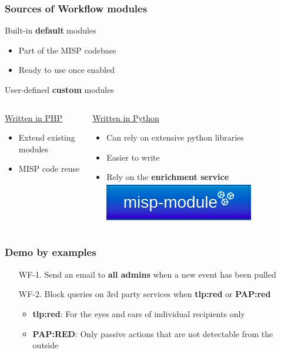 \begin{frame}
    \frametitle{Sources of Workflow modules}
    {\large Built-in \textbf{default} modules}
    \begin{itemize}
        \item Part of the MISP codebase
        \item Ready to use once enabled
    \end{itemize}
    \vspace{1em}
    {\large User-defined \textbf{custom} modules}
    \vspace{0.5em}
    \begin{columns}[t]
        \begin{column}{0.5\textwidth}
            \underline{Written in PHP}
            \begin{itemize}
                \item Extend existing modules
                \item MISP code reuse
            \end{itemize}
        \end{column}
        \begin{column}{0.5\textwidth}
            \underline{Written in Python}
            \begin{itemize}
                \item Can rely on extensive python libraries
                \item Easier to write
                \item Rely on the \textbf{enrichment service} \includegraphics[width=0.12\linewidth]{pictures/misp-module-icon.png}
            \end{itemize}
        \end{column}
    \end{columns}
\end{frame}

\begin{frame}
    \frametitle{Demo by examples}
    \begin{enumerate}
        \item[WF-1.] Send an email to \textbf{all admins} when a new event has been pulled
        \vspace*{2em}
        \item[WF-2.] Block queries on 3rd party services when \textbf{tlp:red} or \textbf{PAP:red}
        \begin{itemize}
            \item \textbf{tlp:red}: For the eyes and ears of individual recipients only
            \item \textbf{PAP:RED}: Only passive actions that are not detectable from the outside
        \end{itemize}
    \end{enumerate}
\end{frame}

